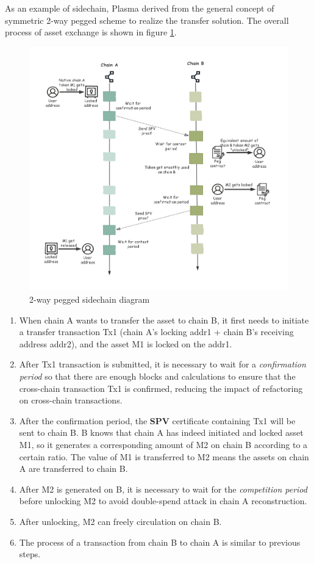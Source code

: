 \noindent As an example of sidechain, Plasma derived from the general concept of symmetric 2-way pegged scheme to realize the transfer solution. The overall process of asset exchange is shown in figure \ref{fig:2way}. 
        \begin{figure}[H]
        \includegraphics[width=1\textwidth]{./figures/2way.png}
        \centering
        \caption{{2-way pegged sidechain diagram}\protect\footnotemark}
        \centering
        \label{fig:2way}
        
        \end{figure}
\begin{enumerate}
    \item When chain A wants to transfer the asset to chain B, it first needs to initiate a transfer transaction Tx1 (chain A's locking addr1 + chain B's receiving address addr2), and the asset M1 is locked on the addr1.
    \item After Tx1 transaction is submitted, it is necessary to wait for a \textit{confirmation period} so that there are enough blocks and calculations to ensure that the cross-chain transaction Tx1 is confirmed, reducing the impact of refactoring on cross-chain transactions.
    \item After the confirmation period, the \textbf{SPV} certificate containing Tx1 will be sent to chain B. B knows that chain A has indeed initiated and locked asset M1, so it generates a corresponding amount of M2 on chain B according to a certain ratio. The value of M1 is transferred to M2 means the assets on chain A are transferred to chain B.
    \item After M2 is generated on B, it is necessary to wait for the \textit{competition period} before unlocking M2 to avoid double-spend attack in chain A reconstruction.
    \item After unlocking, M2 can freely circulation on chain B.
    \item The process of a transaction from chain B to chain A is similar to previous steps.
\end{enumerate}
